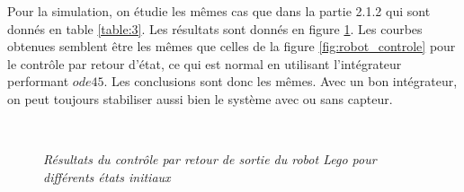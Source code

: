 \documentclass[11pt,french]{article} %
\begin{document}
Pour la simulation, on étudie les mêmes cas que dans la partie 2.1.2 qui sont donnés en table \ref{table:3}. Les résultats sont donnés en figure \ref{fig:robot_capteur}. Les courbes obtenues semblent être les mêmes que celles de la figure \ref{fig:robot_controle} pour le contrôle par retour d'état, ce qui est normal en utilisant l'intégrateur performant $ode45$. Les conclusions sont donc les mêmes. Avec un bon intégrateur, on peut toujours stabiliser aussi bien le système avec ou sans capteur. \\

\begin{figure}[H]%
	\centering
	\noindent{} \\
		\captionsetup{justification=centering}
		\caption{\textit{Résultats du contrôle par retour de sortie du robot Lego pour différents états initiaux}}
		\label{fig:robot_capteur}%
\end{figure}
\vspace{0.5cm}
\end{document}
